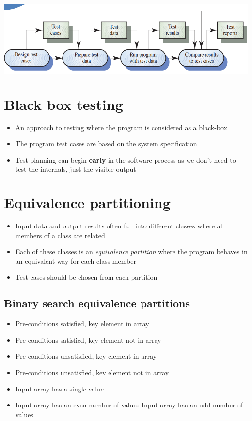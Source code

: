 \documentclass{article}
\newcommand{\worddef}[1]{\hyperref[sec:reference]{\textit{#1}}}
\begin{document}
\begin{center}
  \includegraphics[scale=0.5]{defect_testing.png}
\end{center}

\section{Black box testing}

\begin{itemize}
  \item An approach to testing where the program is considered as a black-box
  \item The program test cases are based on the system specification 
  \item Test planning can begin \textbf{early} in the software process as we don't need to test the internals, just the visible output
\end{itemize}

\section{Equivalence partitioning}

\begin{itemize}
  \item Input data and output results often fall into different classes where all members of a class are related 
  \item Each of these classes is an \worddef{equivalence partition} where the program behaves in an equivalent way for each class member 
  \item Test cases should be chosen from each partition
\end{itemize}

\subsection{Binary search equivalence partitions}

\begin{itemize}
  \item Pre-conditions satisfied, key element in array 
  \item Pre-conditions satisfied, key element not in array 
  \item Pre-conditions unsatisfied, key element in array 
  \item Pre-conditions unsatisfied, key element not in array 
  \item Input array has a single value 
  \item Input array has an even number of values 
   Input array has an odd number of values
\end{itemize}
\end{document}
